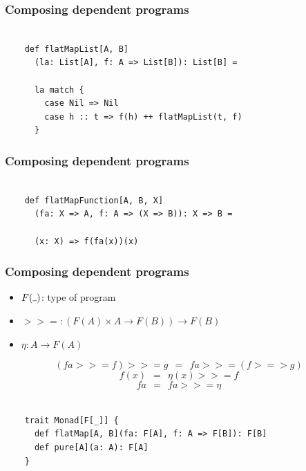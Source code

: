\documentclass{beamer}
\newcommand{\gpause}{\vspace*{-\baselineskip}\pause}
\begin{document}
\begin{frame}[fragile]

  \frametitle{Composing dependent programs}

  \begin{verbatim}

    def flatMapList[A, B]
      (la: List[A], f: A => List[B]): List[B] =

      la match {
        case Nil => Nil
        case h :: t => f(h) ++ flatMapList(t, f)
      }

  \end{verbatim}

\end{frame}

\begin{frame}[fragile]

  \frametitle{Composing dependent programs}

  \begin{verbatim}

    def flatMapFunction[A, B, X]
      (fa: X => A, f: A => (X => B)): X => B =

      (x: X) => f(fa(x))(x)

  \end{verbatim}

\end{frame}

\newcommand{\kcomp}{>\!=\!>}
\newcommand{\bind}{>\!\!>\!=}

\begin{frame}

  \frametitle{Composing dependent programs}
  \large

  \begin{itemize}
    \item $F(\rule{1ex}{.4pt})$: type of program \pause
    \item $\bind: (F(A) \times A \rightarrow F(B)) \rightarrow F(B)$ \pause
    \item $\eta: A \rightarrow F(A)$ \pause
  \end{itemize}

  $$(fa \bind f) \bind g \ \ = \ \ fa \bind (f \kcomp g)$$ \gpause
  $$f(x) \ \ = \ \ \eta(x) \bind f$$ \gpause
  $$fa \ \ = \ \ fa \bind \eta$$

\end{frame}

\begin{frame}[fragile]

  \begin{verbatim}

    trait Monad[F[_]] {
      def flatMap[A, B](fa: F[A], f: A => F[B]): F[B]
      def pure[A](a: A): F[A]
    }

  \end{verbatim}

\end{frame}
\end{document}
